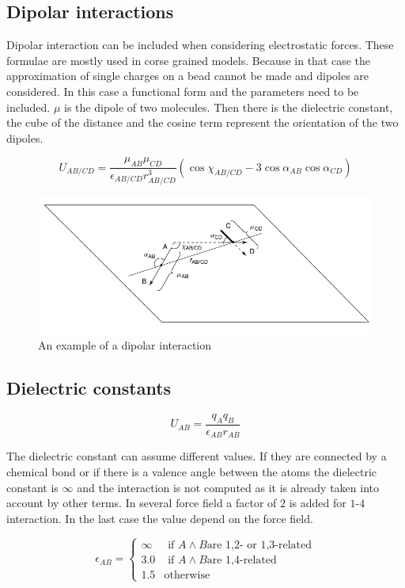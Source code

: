 	\subsection{Dipolar interactions}
	Dipolar interaction can be included when considering electrostatic forces.
	These formulae are mostly used in corse grained models.
	Because in that case the approximation of single charges on a bead cannot be made and dipoles are considered.
	In this case a functional form and the parameters need to be included.
	$\mu$ is the dipole of two molecules.
	Then there is the dielectric constant, the cube of the distance and the cosine term represent the orientation of the two dipoles.

	$$U_{AB/CD} = \frac{\mu_{AB}\mu_{CD}}{\epsilon_{AB/CD}r^3_{AB/CD}}(\cos\chi_{AB/CD}-3\cos\alpha_{AB}\cos\alpha_{CD})$$

	\begin{figure}[H]
		\includegraphics[width=\textwidth]{dipolar-interactions}
		\caption{An example of a dipolar interaction}
		\label{fig:dipolar-interactions}
	\end{figure}

	\subsection{Dielectric constants}

	$$U_{AB} = \frac{q_Aq_B}{\epsilon_{AB}r_{AB}}$$

	The dielectric constant can assume different values.
	If they are connected by a chemical bond or if there is a valence angle between the atoms the dielectric constant is $\infty$ and the interaction is not computed as it is already taken into account by other terms.
	In several force field a factor of $2$ is added for $1$-$4$ interaction.
	In the last case the value depend on the force field.

	$$\epsilon_{AB} = \begin{cases}\infty&\text{ if }A\land B\text{are 1,2- or 1,3-related}\\3.0&\text{ if }A\land B\text{are 1,4-related}\\1.5&\text{otherwise}\end{cases}$$

